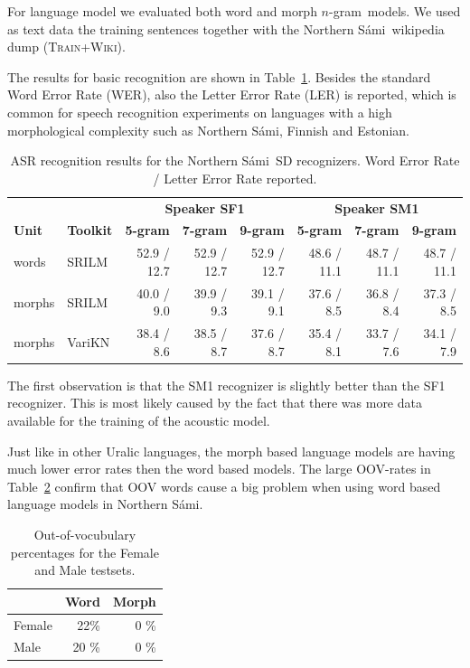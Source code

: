 \documentclass[b5paper]{article}
\newcommand{\ns}{Northern Sámi}
\newcommand{\ngram}{$n$-gram}
\newcommand{\ds}[1]{\textsc{#1}}
\begin{document}
For language model we evaluated both word and morph \ngram\ models. We used as text data the training sentences together with the \ns\ wikipedia dump (\ds{Train+Wiki}).

The results for basic recognition are shown in Table~\ref{tbl:samibasic}. Besides the standard Word Error Rate (WER), also the Letter Error Rate (LER) is reported, which is common for speech recognition experiments on languages with a high morphological complexity such as \ns, Finnish and Estonian.

\begin{table}[!h]
\centering
\begin{tabular}{ll|rrr|rrr}
& & \multicolumn{3}{|c|}{\textbf{Speaker SF1}} & \multicolumn{3}{|c}{\textbf{Speaker SM1}} \\
 \textbf{Unit} & \textbf{Toolkit} & \textbf{5-gram} & \textbf{7-gram} & \textbf{9-gram} & \textbf{5-gram} & \textbf{7-gram} & \textbf{9-gram}\\\hline
 words & SRILM & 52.9 / 12.7 & 52.9 / 12.7& 52.9 / 12.7&48.6 / 11.1 & 48.7 / 11.1 & 48.7 / 11.1\\
morphs & SRILM & 40.0 /  9.0 & 39.9 / 9.3& 39.1 / 9.1 & 37.6 / 8.5 & 36.8 / 8.4 & 37.3 / 8.5 \\
 morphs & VariKN  & 38.4 / 8.6& 38.5 / 8.7  & 37.6 / 8.7 & 35.4 / 8.1 &  33.7 / 7.6 & 34.1 / 7.9 \\

\end{tabular}
\caption{ASR recognition results for the \ns\ SD recognizers. Word Error Rate / Letter Error Rate reported.\label{tbl:samibasic}}
\end{table}


The first observation is that the SM1 recognizer is slightly better than the SF1 recognizer. This is most likely caused by the fact that there was more data available for the training of the acoustic model.

Just like in other Uralic languages, the morph based language models are having much lower error rates then the word based models. The large OOV-rates in Table~\ref{tbl:samioov} confirm that OOV words cause a big problem when using word based language models in \ns.

\begin{table}[!h]
\centering
\begin{tabular}{lrr}
& Word & Morph\\\hline
Female &  22\% & 0 \% \\
Male & 20 \% & 0 \%\\
\end{tabular}
\caption{Out-of-vocubulary percentages for the Female and Male testsets. \label{tbl:samioov}}
\end{table}
\end{document}
